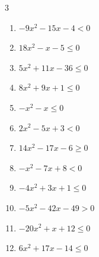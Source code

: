 \begin{multicols}{3}
\begin{enumerate}
  \item $-9x^{2}-15x-4<0$


  \item $18x^{2}-x-5\leq 0$


  \item $5x^{2}+11x-36\leq 0$


  \item $8x^{2}+9x+1\leq 0$


  \item $-x^{2}-x\leq 0$

        \phantom{$\displaystyle x \leqq -1 , \; 0 \leqq x$}

  \item $2x^{2}-5x+3<0$


  \item $14x^{2}-17x-6\geq 0$


  \item $-x^{2}-7x+8<0$

        \phantom{$\displaystyle x < -8 , \; 1 < x$}

\columnbreak %

\resetques

  \item $-4x^{2}+3x+1\leq 0$


  \item $-5x^{2}-42x-49>0$


  \item $-20x^{2}+x+12\leq 0$


  \item $6x^{2}+17x-14\leq 0$



\end{enumerate}
\end{multicols}
